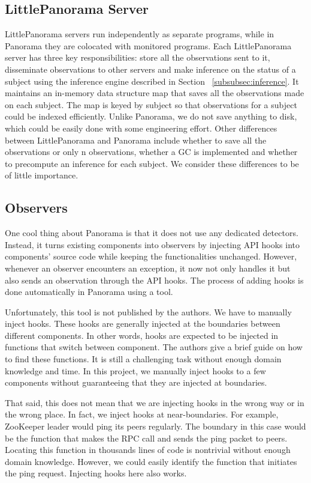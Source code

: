 \subsection{LittlePanorama Server}
LittlePanorama servers run independently as separate programs, while in Panorama they are colocated with monitored programs. Each LittlePanorama server has three key responsibilities: store all the observations sent to it, disseminate observations to other servers and make inference on the status of a subject using the inference engine described in Section ~\ref{subsubsec:inference}. It maintains an in-memory data structure map that saves all the observations made on each subject. The map is keyed by subject so that observations for a subject could be indexed efficiently. Unlike Panorama, we do not save anything to disk, which could be easily done with some engineering effort. Other differences between LittlePanorama and Panorama include whether to save all the observations or only n observations, whether a GC is implemented and whether to precompute an inference for each subject. We consider these differences to be of little importance. 

\subsection{Observers}
\label{subsec:observers}
One cool thing about Panorama is that it does not use any dedicated detectors. Instead, it turns existing components into observers by injecting API hooks into components' source code while keeping the functionalities unchanged. However, whenever an observer encounters an exception, it now not only handles it but also sends an observation through the API hooks. The process of adding hooks is done automatically in Panorama using a tool. 

Unfortunately, this tool is not published by the authors. We have to manually inject hooks. These hooks are generally injected at the boundaries between different components. In other words, hooks are expected to be injected in functions that switch between component. The authors give a brief guide on how to find these functions. It is still a challenging task without enough domain knowledge and time. In this project, we manually inject hooks to a few components without guaranteeing that they are injected at boundaries. 

That said, this does not mean that we are injecting hooks in the wrong way or in the wrong place. In fact, we inject hooks at near-boundaries. For example, ZooKeeper leader would ping its peers regularly. The boundary in this case would be the function that makes the RPC call and sends the ping packet to peers. Locating this function in thousands lines of code is nontrivial without enough domain knowledge. However, we could easily identify the function that initiates the ping request. Injecting hooks here also works.



